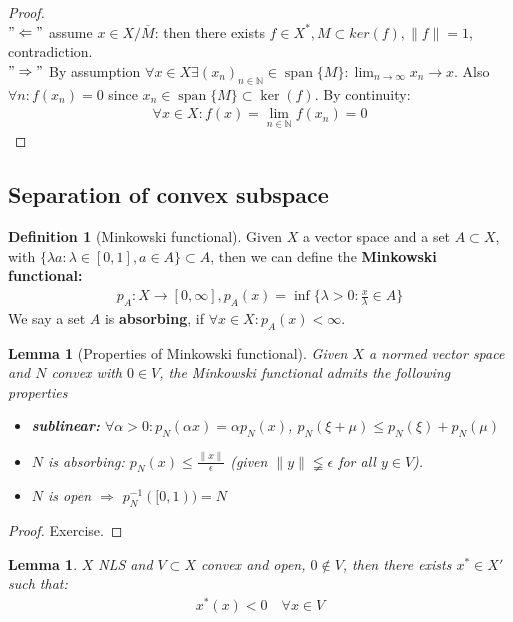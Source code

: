 \documentclass[a4paper,11pt,fleqn]{book}
\newtheorem{lemma}[theorem]{Lemma}
\theoremstyle{definition}
\newtheorem{definition}{Definition}[section]
\theoremstyle{remark}
\DeclareMathOperator*{\spa}{span}
\begin{document}
\begin{proof} \quad\\
$"\Leftarrow"$ assume $x \in X \slash \overline{M}$: then there exists $f \in X^*, M\subset ker(f), \|f\| = 1$, contradiction.\\
$"\Rightarrow"$ By assumption $\forall x \in X \exists (x_n)_{n \in \mathbb{N}} \in \spa\{M\}: \lim_{n \rightarrow \infty} x_n \rightarrow x$. Also $\forall n: f(x_n) = 0$ since $x_n \in \spa\{ M \}\subset \ker(f)$. By continuity:
\begin{align*}
	\forall x \in X: f(x) = \lim_{n \in \mathbb{N}}f(x_n) = 0
\end{align*}
\end{proof}



\subsection{Separation of convex subspace}
\begin{definition}[Minkowski functional]
	Given $X$ a vector space and a set $A \subset X$, with $\{\lambda a: \lambda \in [0, 1], a \in A\} \subset A$, then we can define the \textbf{Minkowski functional:}
	\begin{align*}
		p_A: X \rightarrow [0, \infty], p_A(x) = \inf\{\lambda >0 : \frac{x}{\lambda} \in A\} 
	\end{align*}
	We say a set $A$ is \textbf{absorbing}, if $\forall x \in X: p_A(x) < \infty$.
\end{definition}

\begin{lemma}[Properties of Minkowski functional]
	Given $X$ a normed vector space and $N$ convex with $0 \in V$, the Minkowski functional admits the following properties
	\begin{itemize}
		\item \textbf{sublinear:} $\forall \alpha > 0: p_N(\alpha x ) = \alpha p_N(x)$, $p_N(\xi + \mu) \leq p_N(\xi) + p_N(\mu)$
		\item $N$ is absorbing: $p_N(x) \le \frac{\|x\|}{\epsilon}$ (given $\|y\| \lneqq \epsilon$ for all $y \in V$). 
		\item $N$ is open $\Rightarrow$ $p_N^{-1}([0, 1)) = N$
	\end{itemize}
\end{lemma}
\begin{proof}
	Exercise.
\end{proof}

\begin{lemma}
	$X$ NLS and $V \subset X$ convex and open, $0 \notin V$, then there exists $x^* \in X'$ such that:
	\begin{align*}
		x^*(x) < 0 \quad \forall x \in V
	\end{align*}
\end{lemma}
\end{document}

